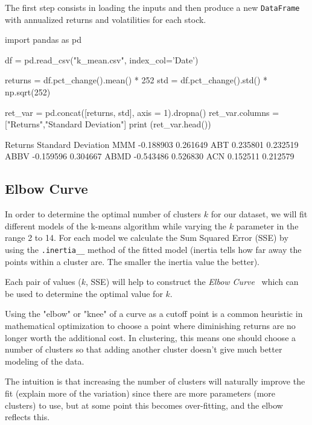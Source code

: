 The first step consists in loading the inputs and then produce a new \texttt{DataFrame} with annualized returns and volatilities for each stock. 
 
\begin{ipython}
import pandas as pd
 
df = pd.read_csv("k_mean.csv", index_col='Date')
 
returns = df.pct_change().mean() * 252
std = df.pct_change().std() * np.sqrt(252)
 
ret_var = pd.concat([returns, std], axis = 1).dropna()
ret_var.columns = ["Returns","Standard Deviation"]
print (ret_var.head())
\end{ipython}
\begin{ioutput}
       Returns  Standard Deviation
MMM  -0.188903            0.261649
ABT   0.235801            0.232519
ABBV -0.159596            0.304667
ABMD -0.543486            0.526830
ACN   0.152511            0.212579
\end{ioutput}

\subsection{Elbow Curve}
 
In order to determine the optimal number of clusters $k$ for our dataset, we will fit different models of the k-means algorithm while varying the $k$ parameter in the range 2 to 14. For each model we calculate the Sum Squared Error (SSE) by using the \texttt{.inertia\_\_} method of the fitted model (inertia tells how far away the points within a cluster are. The smaller the inertia value the better).
 
Each pair of values ($k$, SSE) will help to construct the \emph{Elbow Curve}~\cite{bib:elbow_curve} which can be used to determine the optimal value for $k$. 
 
Using the "elbow" or "knee" of a curve as a cutoff point is a common heuristic in mathematical optimization to choose a point where diminishing returns are no longer worth the additional cost. In clustering, this means one should choose a number of clusters so that adding another cluster doesn't give much better modeling of the data.
 
The intuition is that increasing the number of clusters will naturally improve the fit (explain more of the variation) since there are more parameters (more clusters) to use, but at some point this becomes over-fitting, and the elbow reflects this. 
 
